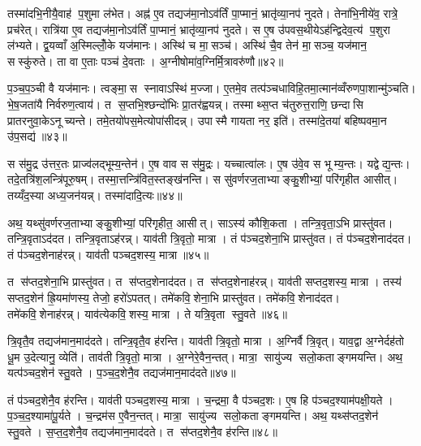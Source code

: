 तस्मा॑दभि॒नीयै॒वाह॑ प॒शुमा ल॑भेत। अह्न॑ ए॒व तद्यज॑मा॒नोऽव॑र्तिं पा॒प्मानं॒ भ्रातृ॑व्या॒नप॑ नुदते। तेना॑भि॒नीये॑व॒ रात्रे॒ प्रच॑रेत्। रात्रि॑या ए॒व तद्यज॑मा॒नोऽव॑र्तिं पा॒प्मानं॒ भ्रातृ॑व्या॒नप॑ नुदते। स ए॒ष उ॑पवस॒थीयेऽह॑न्द्विदेव॒त्य॑ प॒शुरा ल॑भ्यते। द्व॒यव्वाँ अ॒स्मिल्लोँ॒के यज॑मानः। अस्थि॑ च मा॒सञ्च॑। अस्थि॑ चै॒व तेन॑ मा॒सञ्च॒ यज॑मान॒ सस्कु॑रुते। ता वा ए॒ताः पञ्च॑ दे॒वताः। अ॒ग्नीषोमा॑व॒ग्निर्मि॒त्रावरु॑णौ॥४२॥

प॒ञ्च॒प॒ञ्ची वै यज॑मानः। त्वङ्मा॒स स्नावाऽस्थि॑ म॒ज्जा। ए॒तमे॒व तत्प॑ञ्चधाविहि॒तमा॒त्मान॑व्वँरुणपा॒शान्मु॑ञ्चति। भे॒ष॒जता॑यै निर्वरुण॒त्वाय॑। त स॒प्तभि॒श्छन्दो॑भिः प्रा॒तर॑ह्वयन्न्। तस्माथ्स॒प्त च॑तुरुत्त॒राणि॒ छन्दासि प्रातरनुवा॒केऽनूच्यन्ते। तमे॒तयो॑पस॒मेत्योपा॑सीदन्न्। उपास्मै गायता नर॒ इति॑। तस्मा॑दे॒तया॑ बहिष्पवमा॒न उ॑प॒सद्य॑॥४३॥\anuvakamend[ऐ॒च्छ॒न्न॒न॒य॒स्ति॒ष्ठ॒न्ते॒ऽनूच्या॒नूच्य॑ स्रु॒वेणा॑घा॒रमा॒घार्य॒ रात्रि॑या ए॒व तद्दे॒वा अव॑र्तिं पा॒प्मानं॑ मृ॒त्युमप॑जिघ्निरे मि॒त्रावरु॑णौ॒ नव॑ च (दे॒वा यज॑मानो दे॒वा दे॒वा यज॑मानो॒ यज॑मानोऽलभन्त॒ प्राच॑रल्लँभेत॒ प्रच॑रे॒दाल॑भ॒न्ताल॑भेत मृ॒त्युमप॑जघ्निरे॒ भ्रातृ॑व्यान्॥)]

स स॑मु॒द्र उ॑त्तर॒तः प्राज्व॑लद्भूम्य॒न्तेन॑। ए॒ष वाव स स॑मु॒द्रः। यच्चात्वा॑लः। ए॒ष उ॑वे॒व स भूम्य॒न्तः। यद्वेद्य॒न्तः। तदे॒तत्रि॑श॒लन्त्रि॑पूरु॒षम्। तस्मा॒त्तन्त्रि॑वित॒स्तङ्ख॑नन्ति। स सु॑वर्णरज॒ताभ्याङ्कु॒शीभ्यां॒ परि॑गृहीत आसीत्। तय्यँद॒स्या अध्य॒जन॑यन्न्। तस्मा॑दादि॒त्यः॥४४॥

अथ॒ यथ्सु॑वर्णरज॒ताभ्याङ्कु॒शीभ्यां॒ परि॑गृहीत॒ आसीत्। साऽस्य॑ कौशि॒कता। तन्त्रि॒वृता॒ऽभि प्रास्तु॑वत। तन्त्रि॒वृताऽद॑दत। तन्त्रि॒वृताऽह॑रन्न्। याव॑ती त्रि॒वृतो॒ मात्रा। तं प॑ञ्चद॒शेना॒भि प्रास्तु॑वत। तं प॑ञ्चद॒शेनाद॑दत। तं प॑ञ्चद॒शेनाह॑रन्न्। याव॑ती पञ्चद॒शस्य॒ मात्रा॥४५॥

त स॑प्तद॒शेना॒भि प्रास्तु॑वत। त स॑प्तद॒शेनाद॑दत। त स॑प्तद॒शेनाह॑रन्न्। याव॑ती सप्तद॒शस्य॒ मात्रा। तस्य॑ सप्तद॒शेन॑ ह्रि॒यमा॑णस्य॒ तेजो॒ हरो॑ऽपतत्। तमे॑कवि॒शेना॒भि प्रास्तु॑वत। तमे॑कवि॒शेनाद॑दत। तमे॑कवि॒शेनाह॑रन्न्। याव॑त्येकवि॒शस्य॒ मात्रा। ते यत्रि॒वृता स्तु॒वते॥४६॥

त्रि॒वृतै॒व तद्यज॑मान॒माद॑दते। तन्त्रि॒वृतै॒व ह॑रन्ति। याव॑ती त्रि॒वृतो॒ मात्रा। अ॒ग्निर्वै त्रि॒वृत्। याव॒द्वा अ॒ग्नेर्दह॑तो धू॒म उ॒देत्यानु॒ व्येति॑। ताव॑ती त्रि॒वृतो॒ मात्रा। अ॒ग्नेरे॒वैन॒न्तत्। मात्रा॒ सायु॑ज्य सलो॒कताङ्गमयन्ति। अथ॒ यत्प॑ञ्चद॒शेन॑ स्तु॒वते। प॒ञ्च॒द॒शेनै॒व तद्यज॑मान॒माद॑दते॥४७॥

तं प॑ञ्चद॒शेनै॒व ह॑रन्ति। याव॑ती पञ्चद॒शस्य॒ मात्रा। च॒न्द्रमा॒ वै प॑ञ्चद॒शः। ए॒ष हि प॑ञ्चद॒श्याम॑पक्षी॒यते। प॒ञ्च॒द॒श्यामा॑पू॒र्यते। च॒न्द्रम॑स ए॒वैन॒न्तत्। मात्रा॒ सायु॑ज्य सलो॒कताङ्गमयन्ति। अथ॒ यथ्स॑प्तद॒शेन॑ स्तु॒वते। स॒प्त॒द॒शेनै॒व तद्यज॑मान॒माद॑दते। त स॑प्तद॒शेनै॒व ह॑रन्ति॥४८॥

